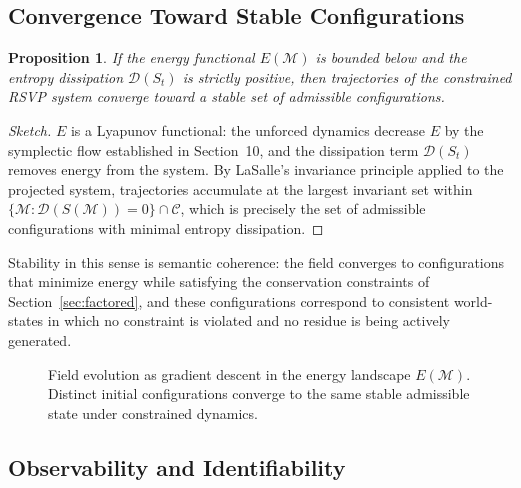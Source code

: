 \documentclass[11pt]{article}
\newtheorem{proposition}[theorem]{Proposition}
\begin{document}
\subsection{Convergence Toward Stable Configurations}

\begin{proposition}
If the energy functional $E(\mathcal{M})$ is bounded below and the entropy
dissipation $\mathcal{D}(S_t)$ is strictly positive, then trajectories of
the constrained RSVP system converge toward a stable set of admissible
configurations.
\end{proposition}

\begin{proof}[Sketch]
$E$ is a Lyapunov functional: the unforced dynamics decrease $E$ by the
symplectic flow established in Section~10, and the dissipation term
$\mathcal{D}(S_t)$ removes energy from the system.
By LaSalle's invariance principle applied to the projected system,
trajectories accumulate at the largest invariant set within
$\{\mathcal{M} : \mathcal{D}(S(\mathcal{M})) = 0\} \cap \mathcal{C}$,
which is precisely the set of admissible configurations with minimal
entropy dissipation.
\end{proof}

Stability in this sense is semantic coherence: the field converges to
configurations that minimize energy while satisfying the conservation
constraints of Section~\ref{sec:factored}, and these configurations
correspond to consistent world-states in which no constraint is violated
and no residue is being actively generated.

\begin{figure}[h]
\centering
{}
\caption{Field evolution as gradient descent in the energy landscape
$E(\mathcal{M})$. Distinct initial configurations converge to the
same stable admissible state under constrained dynamics.}
\end{figure}

\subsection{Observability and Identifiability}
\label{sec:observability}
\end{document}
